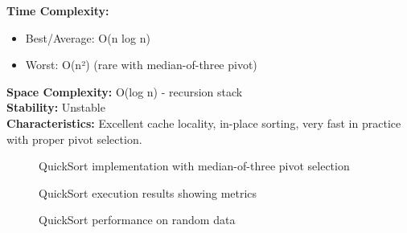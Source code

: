 \documentclass[12pt]{article}
\begin{document}
\textbf{Time Complexity:} 
\begin{itemize}
    \item Best/Average: O(n log n)
    \item Worst: O(n²) (rare with median-of-three pivot)
\end{itemize}

\textbf{Space Complexity:} O(log n) - recursion stack \\
\textbf{Stability:} Unstable \\
\textbf{Characteristics:} Excellent cache locality, in-place sorting, very fast in practice with proper pivot selection.

\begin{figure}[H]
    \centering
    \caption{QuickSort implementation with median-of-three pivot selection}
    \label{fig:quicksort_impl}
\end{figure}

\begin{figure}[H]
    \centering
    \caption{QuickSort execution results showing metrics}
    \label{fig:quicksort_results}
\end{figure}

\begin{figure}[H]
    \centering
    \caption{QuickSort performance on random data}
    \label{fig:quicksort_graph}
\end{figure}
\end{document}
